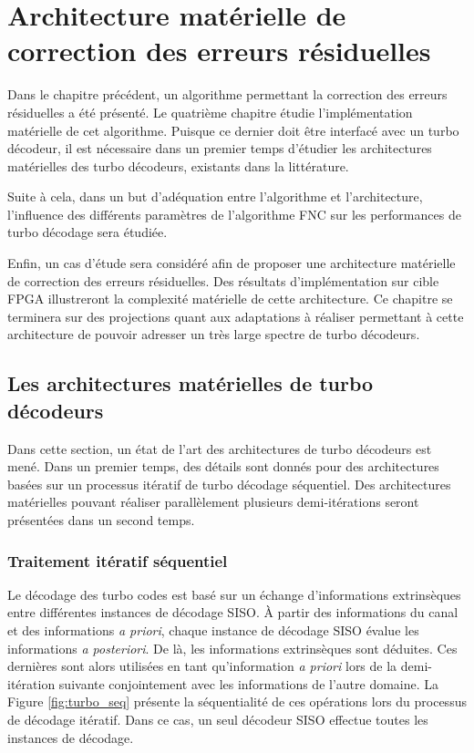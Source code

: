 \chapter{Architecture matérielle de correction des erreurs résiduelles}

Dans le chapitre précédent, un algorithme permettant la correction des erreurs résiduelles a été présenté. Le quatrième 
chapitre
étudie l'implémentation matérielle de cet algorithme. Puisque ce dernier doit être interfacé avec un
turbo décodeur, il est nécessaire dans un premier temps d'étudier les architectures matérielles des turbo décodeurs,
existants dans la littérature. 

Suite à cela, dans un but d'adéquation entre l'algorithme et l'architecture, l'influence des différents paramètres 
de l'algorithme FNC sur les performances de turbo décodage sera étudiée.

Enfin, un cas d'étude sera considéré afin de proposer une architecture matérielle de correction des erreurs résiduelles.
Des résultats d’implémentation sur cible FPGA illustreront la complexité matérielle de cette architecture.
Ce chapitre se terminera sur des projections quant aux adaptations à réaliser permettant à cette architecture de 
pouvoir adresser un très large spectre de turbo décodeurs.

\vspace*{\fill}
\minitocTITI
\vspace*{\fill}
\newpage

\section{Les architectures matérielles de turbo décodeurs}
Dans cette section, un état de l'art des architectures de turbo décodeurs est mené. Dans un premier temps, des détails 
sont donnés pour des architectures basées sur un processus itératif de turbo décodage séquentiel. Des architectures 
matérielles pouvant réaliser parallèlement plusieurs demi-itérations seront présentées dans un second temps.

\subsection{Traitement itératif séquentiel}
Le décodage des turbo codes est basé sur un échange d'informations extrinsèques entre différentes instances de décodage SISO. À partir 
des informations du canal et des informations \textit{a priori}, chaque instance de décodage SISO évalue les informations 
\textit{a posteriori}. De là, les informations extrinsèques sont déduites. Ces dernières sont alors utilisées en tant
qu'information \textit{a priori} lors de la demi-itération suivante conjointement avec les informations de l'autre
domaine. La Figure \ref{fig:turbo_seq} présente la séquentialité de ces opérations lors du processus de décodage
itératif. Dans ce cas, un seul décodeur SISO effectue toutes les instances de décodage.

